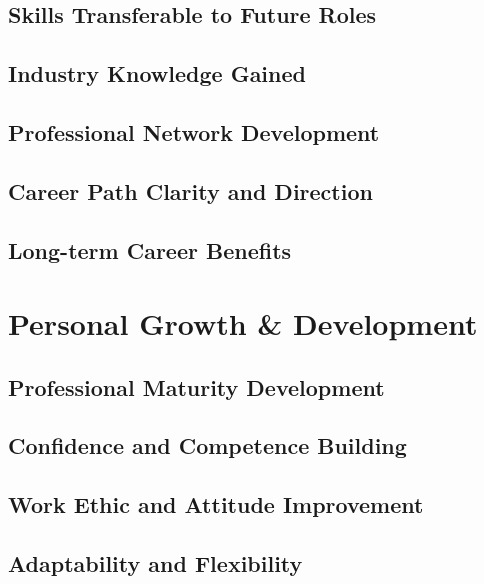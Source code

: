 \subsection{Skills Transferable to Future Roles}

\subsection{Industry Knowledge Gained}

\subsection{Professional Network Development}

\subsection{Career Path Clarity and Direction}

\subsection{Long-term Career Benefits}

\section{Personal Growth \& Development}

\subsection{Professional Maturity Development}

\subsection{Confidence and Competence Building}

\subsection{Work Ethic and Attitude Improvement}

\subsection{Adaptability and Flexibility}

